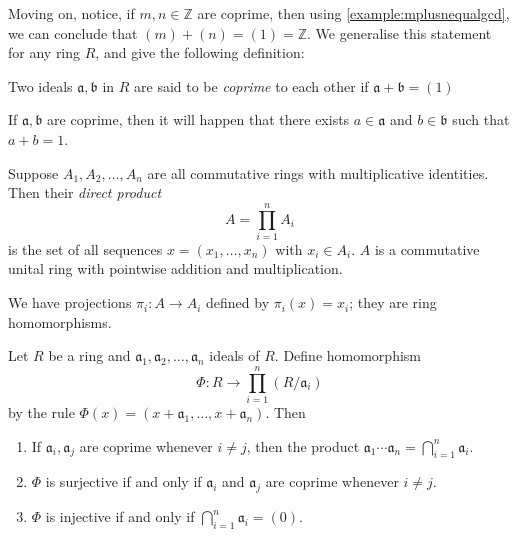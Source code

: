 Moving on, notice, if \(m, n \in \mathbb{Z}\) are coprime, then using \autoref{example:mplusnequalgcd}, we can conclude that  \((m) + (n) = (1) = \mathbb{Z}\). We generalise this statement for any ring  \(R\), and give the following definition:
\begin{definition}
Two ideals \(\mathfrak{a, b}\) in \(R\) are said to be \emph{coprime} to each other if \(\mathfrak{a}+\mathfrak{b} = (1)\)
\end{definition}
If \(\mathfrak{a}, \mathfrak{b}\) are coprime, then it will happen that there exists \(a \in \mathfrak{a}\) and \(b \in \mathfrak{b}\) such that \(a+b = 1\).
\begin{definition}
    Suppose \(A_1, A_2, \ldots, A_n\) are all commutative rings with multiplicative identities. Then their \emph{direct product} \[
        A = \prod_{i=1}^n A_i
    \] is the set of all sequences \(x = (x_1, \ldots, x_n)\) with \(x_i \in A_i\). 
     \(A\) is a commutative unital ring with pointwise addition and multiplication. 
\end{definition}
We have projections \(\pi_i: A \longrightarrow A_i\) defined by \(\pi_i(x) =x_i\); they are ring homomorphisms.
\begin{proposition}\label{proposition:RhomtoR/a_is}
    Let \(R\) be a ring and  \(\mathfrak{a}_1, \mathfrak{a}_2, \ldots, \mathfrak{a}_n\) ideals of \(R\). Define homomorphism  \[
    \Phi: R \longrightarrow \prod_{i=1}^{n} (R/\mathfrak{a}_i)
    \]  by the rule \(\Phi(x) = (x+\mathfrak{a}_1, \ldots, x+\mathfrak{a}_n)\). Then
    \begin{enumerate}[label=\roman*.]
        \item If \(\mathfrak{a}_i, \mathfrak{a}_j\) are coprime whenever \(i \neq j\), then the product \(\mathfrak{a}_1 \cdots \mathfrak{a}_n = \bigcap_{i=1}^n \mathfrak{a}_i\).
        \item \(\Phi\) is surjective if and only if \(\mathfrak{a}_i\) and \(\mathfrak{a}_j\) are coprime whenever \(i \neq j\).
        \item  \(\Phi\) is injective if and only if \(\bigcap_{i=1}^n \mathfrak{a}_i = (0)\).
    \end{enumerate}
\end{proposition}
